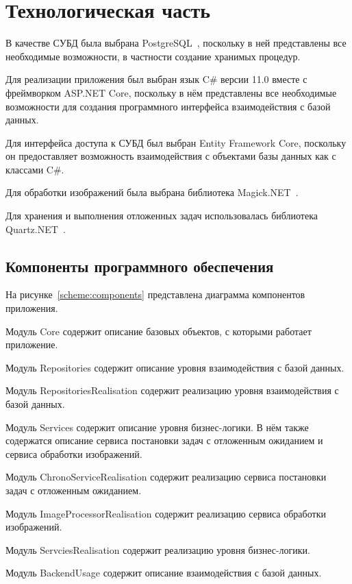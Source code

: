 \chapter{Технологическая часть}

В качестве СУБД была выбрана PostgreSQL~\cite{postgresql}, поскольку в ней представлены все необходимые возможности, в частности создание хранимых процедур.

Для реализации приложения был выбран язык C\# версии 11.0 вместе с фреймворком ASP.NET Core, поскольку в нём представлены все необходимые возможности для создания программного интерфейса взаимодействия с базой данных.

Для интерфейса доступа к СУБД был выбран Entity Framework Core, поскольку он предоставляет возможность взаимодействия с объектами базы данных как с классами C\#.

Для обработки изображений была выбрана библиотека Magick.NET~\cite{magicknet}. 

Для хранения и выполнения отложенных задач использовалась библиотека Quartz.NET~\cite{quartznet}.

\section{Компоненты программного обеспечения}
На рисунке~\ref{scheme:components} представлена диаграмма компонентов приложения.

Модуль Core содержит описание базовых объектов, с которыми работает приложение.

Модуль Repositories содержит описание уровня взаимодействия с базой данных. 

Модуль RepositoriesRealisation содержит реализацию уровня взаимодействия с базой данных. 

Модуль Services содержит описание уровня бизнес-логики. В нём также содержатся описание сервиса постановки задач с отложенным ожиданием и сервиса обработки изображений.

Модуль ChronoServiceRealisation содержит реализацию сервиса постановки задач с отложенным ожиданием.

Модуль ImageProcessorRealisation содержит реализацию сервиса обработки изображений.

Модуль ServciesRealisation содержит реализацию уровня бизнес-логики.

Модуль BackendUsage содержит описание взаимодействия с базой данных.

